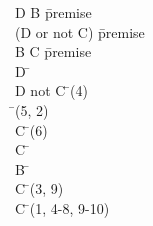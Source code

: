 \documentclass{article}
\begin{document}
\begin{proofbox}
\: D \lor B \= \hbox{premise} \\
\: \lnot (D or not C) \= \hbox{premise} \\
\: B \rightarrow C \= \hbox{premise} \\
\openAlt
\: D \= \asm \\
\: D \lor not C \= \orintro(4) \\
\: \bot \= \bottomintro(5, 2) \\
\: C \= \bottomelim(6) \\
\: C \=  \\
\splitAlt
\: B \= \asm \\
\: C \= \implieselim(3, 9) \\
\closeAlt
\: C \= \orelim(1, 4-8, 9-10) \\
\end{proofbox}
\end{document}
